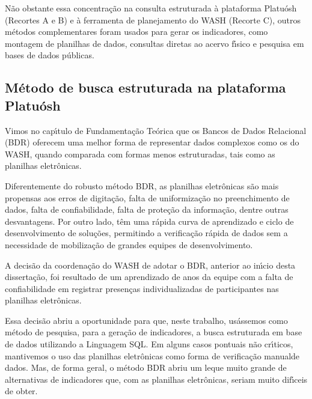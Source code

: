 \documentclass[
12pt,		%
openright,	%
twoside,  %
a4paper,			%
chapter=TITLE,		%
english,			%
french,				%
spanish,			%
brazil				%
]{USPSC-classe/USPSC}
\begin{document}
N\~ao obstante essa concentra\c{c}\~ao na consulta estruturada \`a plataforma Platu\'osh (Recortes A e B) e \`a ferramenta de planejamento do WASH (Recorte C), outros m\'etodos complementares foram usados para gerar os indicadores, como montagem de planilhas de dados, consultas diretas ao acervo f\'{\i}sico e pesquisa em bases de dados p\'ublicas.








\subsection[M\'etodo de busca estruturada na plataforma Platu\'osh]{M\'etodo de busca estruturada na plataforma Platu\'osh}\label{M\'etodo de busca estruturada na plataforma Platu\'osh}
Vimos no cap\'{\i}tulo de Fundamenta\c{c}\~ao Te\'orica que os Bancos de Dados Relacional (BDR) oferecem uma melhor forma de representar dados complexos como os do WASH, quando comparada com formas menos estruturadas, tais como as planilhas eletr\^onicas.








Diferentemente do robusto m\'etodo BDR, as planilhas eletr\^onicas s\~ao mais propensas aos erros de digita\c{c}\~ao, falta de uniformiza\c{c}\~ao no preenchimento de dados, falta de confiabilidade, falta de prote\c{c}\~ao da informa\c{c}\~ao, dentre outras desvantagens. Por outro lado, t\^em uma r\'apida curva de aprendizado e ciclo de desenvolvimento de solu\c{c}\~oes, permitindo a verifica\c{c}\~ao r\'apida de dados sem a necessidade de mobiliza\c{c}\~ao de grandes equipes de desenvolvimento.








A decis\~ao da coordena\c{c}\~ao do WASH de adotar o BDR, anterior ao in\'{\i}cio desta disserta\c{c}\~ao, foi resultado de um aprendizado de anos da equipe com a falta de confiabilidade em registrar presen\c{c}as individualizadas de participantes nas planilhas eletr\^onicas.








Essa decis\~ao abriu a oportunidade para que, neste trabalho, us\'assemos como m\'etodo de pesquisa, para a gera\c{c}\~ao de indicadores, a busca estruturada em base de dados utilizando a Linguagem SQL. Em alguns casos pontuais n\~ao cr\'{\i}ticos, mantivemos o uso das planilhas eletr\^onicas como forma de verifica\c{c}\~ao \textquotedbl manual\textquotedbl  de dados. Mas, de forma geral, o m\'etodo BDR abriu um leque muito grande de alternativas de indicadores que, com as planilhas eletr\^onicas, seriam muito dif\'{\i}ceis de obter.
\end{document}
